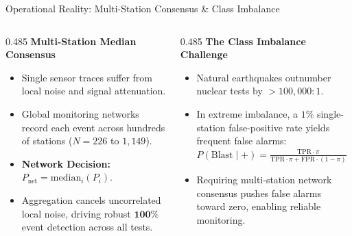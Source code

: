 \documentclass[aspectratio=169,11pt]{beamer}
\begin{document}
\begin{frame}{Operational Reality: Multi-Station Consensus \& Class Imbalance}
  \par
  \vspace*{0.4cm}

  \begin{columns}[T,onlytextwidth]
    \begin{column}{0.485\textwidth}
      \textbf{\color{navy} Multi-Station Median Consensus}
      \vspace*{0.3em}
      \begin{itemize}\small
        \item Single sensor traces suffer from local noise and signal attenuation.
        \item Global monitoring networks record each event across hundreds of stations ($N = 226$ to $1,149$).
        \item \textbf{Network Decision:} $P_{\mathrm{net}} = \mathrm{median}_{i}(P_i)$.
        \item Aggregation cancels uncorrelated local noise, driving robust $\mathbf{100\%}$ event detection across all tests.
      \end{itemize}
    \end{column}
    \hfill
    \begin{column}{0.485\textwidth}
      \textbf{\color{blastred} The Class Imbalance Challenge}
      \vspace*{0.3em}
      \begin{itemize}\small
        \item Natural earthquakes outnumber nuclear tests by $> 100,000 : 1$.
        \item In extreme imbalance, a $1\%$ single-station false-positive rate yields frequent false alarms:
          \\[0.4em]
          \scriptsize
          $P(\text{Blast} \mid +) = \frac{\text{TPR} \cdot \pi}{\text{TPR} \cdot \pi + \text{FPR} \cdot (1 - \pi)}$
          \\[0.4em]\small
        \item Requiring multi-station network consensus pushes false alarms toward zero, enabling reliable monitoring.
      \end{itemize}
    \end{column}
  \end{columns}
\end{frame}
\end{document}
